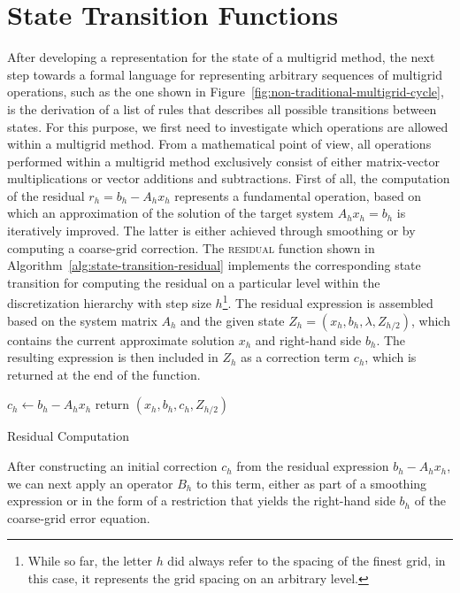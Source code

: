 \section{State Transition Functions}
\label{sec:multigrid-state-transitions}
After developing a representation for the state of a multigrid method, the next step towards a formal language for representing arbitrary sequences of multigrid operations,
such as the one shown in Figure~\ref{fig:non-traditional-multigrid-cycle}, is the derivation of a list of rules that describes all possible transitions between states.
For this purpose, we first need to investigate which operations are allowed within a multigrid method.
From a mathematical point of view, all operations performed within a multigrid method exclusively consist of either matrix-vector multiplications or vector additions and subtractions.
First of all, the computation of the residual $r_h = b_h - A_h x_h$ represents a fundamental operation, based on which an approximation of the solution of the target system $A_h x_h = b_h$ is iteratively improved.
The latter is either achieved through smoothing or by computing a coarse-grid correction.
The \textsc{residual} function shown in Algorithm~\ref{alg:state-transition-residual} implements the corresponding state transition for computing the residual on a particular level within the discretization hierarchy with step size $h$\footnote{While so far, the letter $h$ did always refer to the spacing of the finest grid, in this case, it represents the grid spacing on an arbitrary level.}.
The residual expression is assembled based on the system matrix $A_h$ and the given state $Z_h = (x_h, b_h, \lambda, Z_{h/2})$, which contains the current approximate solution $x_h$ and right-hand side $b_h$.
The resulting expression is then included in $Z_h$ as a correction term $c_h$, which is returned at the end of the function.
\begin{algorithm}
	\begin{algorithmic}
		\State $c_h \gets b_h - A_h x_h$
		\State return $(x_h, b_h, c_h, Z_{h/2})$
		\EndFunction
	\end{algorithmic}
\caption{Residual Computation}
\label{alg:state-transition-residual}
\end{algorithm}
After constructing an initial correction $c_h$ from the residual expression $b_h - A_h x_h$, we can next apply an operator $B_h$ to this term, either as part of a smoothing expression or in the form of a restriction that yields the right-hand side $b_h$ of the coarse-grid error equation.
